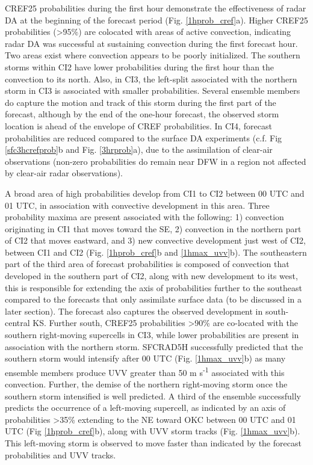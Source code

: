 CREF25 probabilities during the first hour demonstrate the effectiveness of radar DA at the beginning of the forecast period (Fig. \ref{1hprob_cref}a). Higher CREF25 probabilities (\textgreater 95\%) are colocated with areas of active convection, indicating radar DA was successful at sustaining convection during the first forecast hour. Two areas exist where convection appears to be poorly initialized. The southern storms within CI2 have lower probabilities during the first hour than the convection to its north. Also, in CI3, the left-split associated with the northern storm in CI3 is associated with smaller probabilities. Several ensemble members do capture the motion and track of this storm during the first part of the forecast, although by the end of the one-hour forecast, the observed storm location is ahead of the envelope of CREF probabilities. In CI4, forecast probabilities are reduced compared to the surface DA experiments (c.f. Fig \ref{sfc3hcrefprob}b and Fig. \ref{3hrprob}a), due to the assimilation of clear-air observations (non-zero probabilities do remain near DFW in a region not affected by clear-air radar observations).

A broad area of high probabilities develop from CI1 to CI2 between 00 UTC and 01 UTC, in association with convective development in this area. Three probability maxima are present associated with the following: 1) convection originating in CI1 that moves toward the SE, 2) convection in the northern part of CI2 that moves eastward, and 3) new convective development just west of CI2, between CI1 and CI2 (Fig. \ref{1hprob_cref}b and \ref{1hmax_uvv}b). The southeastern part of the third area of forecast probabilities is composed of convection that developed in the southern part of CI2, along with new development to its west, this is responsible for extending the axis of probabilities further to the southeast compared to the forecasts that only assimilate surface data (to be discussed in a later section). The forecast also captures the observed development in south-central KS. Further south, CREF25 probabilities \textgreater 90\% are co-located with the southern right-moving supercells in CI3, while lower probabilities are present in association with the northern storm. SFCRAD5H successfully predicted that the southern storm would intensify after 00 UTC (Fig. \ref{1hmax_uvv}b) as many ensemble members produce UVV greater than 50 m s\textsuperscript{-1} associated with this convection. Further, the demise of the northern right-moving storm once the southern storm intensified is well predicted. A third of the ensemble successfully predicts the occurrence of a left-moving supercell, as indicated by an axis of probabilities \textgreater 35\% extending to the NE toward OKC between 00 UTC and 01 UTC (Fig \ref{1hprob_cref}b), along with UVV storm tracks (Fig. \ref{1hmax_uvv}b). This left-moving storm is observed to move faster than indicated by the forecast probabilities and UVV tracks. 

